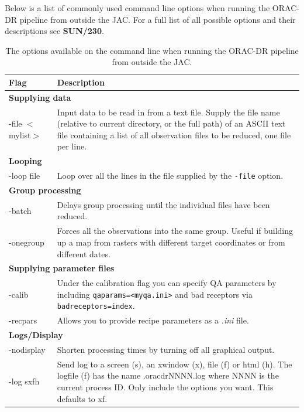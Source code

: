 \documentclass[twoside,11pt]{article}
\newcommand{\xref}[3]{#1}
\renewcommand{\_}{\texttt{\symbol{95}}}
\newcommand{\param}[1]{\texttt{#1}}
\newcommand{\oracdrsun}{\xref{\textbf{SUN/230}}{sun230}{}}
\begin{document}
Below is a list of commonly used command line options when running the ORAC-DR pipeline from outside the JAC. For a full list of all possible options and their descriptions see \oracdrsun.
\begin{table}[h!]
\begin{tabular}{p{2.5cm}|p{12.5cm}}

\textbf{Flag} & \textbf{Description} \\
\hline
\multicolumn{2}{l}{\textbf{Supplying data}} \\
\hline
-file $<$mylist$>$& Input data to be read in from a text file. Supply the file name (relative to current directory, or the full path) of an ASCII text file containing a list of all observation files to be reduced, one file per line. \\
\hline
\multicolumn{2}{l}{\textbf{Looping}} \\
\hline
-loop file  & Loop over all the lines in the file supplied by the \param{-file}  option. \\
\hline
\multicolumn{2}{l}{\textbf{Group processing}} \\
\hline
-batch &Delays group processing until the individual files have been reduced.  \\
-onegroup & Forces all the observations into the same group. Useful if building up a map from rasters with different target coordinates or from different dates.  \\
\hline
\multicolumn{2}{l}{\textbf{Supplying parameter files}} \\
\hline
-calib & Under the calibration flag you can specify QA parameters by including \param{qaparams=<myqa.ini>} and bad receptors via \param{bad\_receptors=index}.\\
-recpars & Allows you to provide recipe parameters as a \textit{.ini} file.  \\
\hline
\multicolumn{2}{l}{\textbf{Logs/Display}} \\
\hline
-nodisplay & Shorten processing times by turning off all graphical output. \\
-log sxfh &  Send log to a screen (s), an xwindow (x), file (f) or html (h). The logfile (f) has the name .oracdr\_NNNN.log where NNNN is the current process ID. Only include the options you want. This defaults to xf.\\
\hline
\end{tabular}
\label{tab:pipe-options}
\caption{\small The options available on the command line when running the ORAC-DR pipeline from outside the JAC.}
\end{table}
\end{document}
